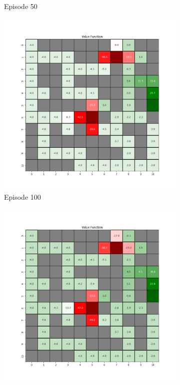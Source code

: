 \documentclass{assignment}
\begin{document}
\begin{figure}[H]
\begin{subfigure}{0.3\textwidth}
    \caption{Episode 50}
    \end{subfigure}\hfill
    \begin{subfigure}{0.3\textwidth}
        \includegraphics[width=\textwidth]{figures/value_td/gamma_sweep/value_function_alpha_0.1_gamma_0.75_epsilon_0.2_iteration_100.png}
    \caption{Episode 100}
    \end{subfigure}
    \begin{subfigure}{0.3\textwidth}
        \includegraphics[width=\textwidth]{figures/value_td/gamma_sweep/value_function_alpha_0.1_gamma_0.75_epsilon_0.2_iteration_1000.png}

\end{subfigure}
\end{figure}
\end{document}
